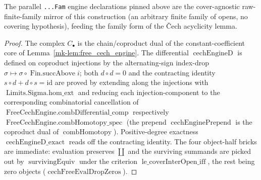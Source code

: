 \begin{lemma}
  The parallel \texttt{...Fam} engine declarations pinned above are the cover-agnostic
  raw-finite-family mirror of this construction (an arbitrary finite family of opens,
  no covering hypothesis), feeding the family form of the {\v C}ech acyclicity lemma.
\end{lemma}

\begin{proof}
  The complex \(C_\bullet\) is the chain/coproduct dual of the constant-coefficient
  core of Lemma~\ref{mk-lem:free_cech_engine}. The differential
  \(\operatorname{cechEngineD}\) is defined on coproduct injections by the
  alternating-sign index-drop \(\sigma \mapsto \sigma \circ \operatorname{Fin.succAbove}
  i\); both \(d \circ d = 0\) and the contracting identity
  \(s \circ d + d \circ s = \mathrm{id}\) are proved by extending along the
  injections with \(\operatorname{Limits.Sigma.hom\_ext}\) and reducing each
  injection-component to the corresponding combinatorial cancellation of
  \(\operatorname{FreeCechEngine.combDifferential\_comp}\) respectively
  \(\operatorname{FreeCechEngine.combHomotopy\_spec}\) (the prepend
  \(\operatorname{cechEnginePrepend}\) is the coproduct dual of
  \(\operatorname{combHomotopy}\)). Positive-degree exactness
  \(\operatorname{cechEngineD\_exact}\) reads off the contracting identity. The four
  object-half bricks are immediate: evaluation preserves \(\coprod\) and the surviving
  summands are picked out by \(\operatorname{survivingEquiv}\) under the criterion
  \(\operatorname{le\_coverInterOpen\_iff}\), the rest being zero objects
  (\(\operatorname{cechFreeEvalDropZeros}\)).
\end{proof}

